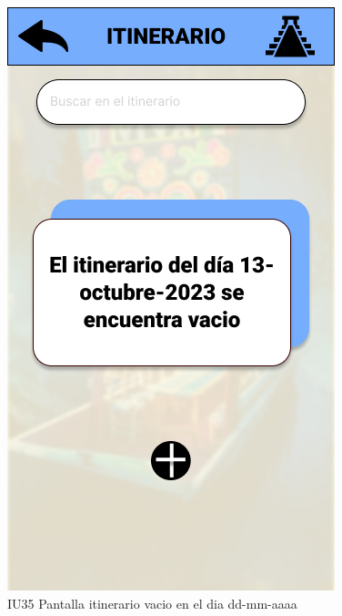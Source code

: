 \begin{figure}[h]
    \begin{minipage}{0.5\textwidth}
        \centering
        \includegraphics[width=.7\linewidth]{Pantallas Prototipo3/IU35-itinerario vacio en el dia x-x-x.jpg}
        \caption{IU35 Pantalla itinerario vacio en el dia dd-mm-aaaa}
    \end{minipage}
    

\end{figure}
